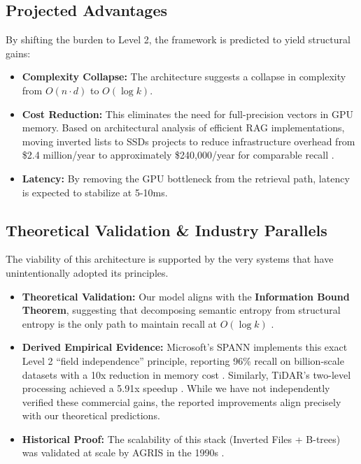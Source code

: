 \documentclass[manuscript,screen,nonacm]{acmart}
\begin{document}
\subsection{Projected Advantages}
By shifting the burden to Level 2, the framework is predicted to yield structural gains:
\begin{itemize}
    \item \textbf{Complexity Collapse:} The architecture suggests a collapse in complexity from $O(n \cdot d)$ to $O(\log k)$.
    \item \textbf{Cost Reduction:} This eliminates the need for full-precision vectors in GPU memory. Based on architectural analysis of efficient RAG implementations, moving inverted lists to SSDs projects to reduce infrastructure overhead from \$2.4 million/year to approximately \$240,000/year for comparable recall \cite{vectordb2024}.
    \item \textbf{Latency:} By removing the GPU bottleneck from the retrieval path, latency is expected to stabilize at 5-10ms.
\end{itemize}

\subsection{Theoretical Validation \& Industry Parallels}
The viability of this architecture is supported by the very systems that have unintentionally adopted its principles.
\begin{itemize}
    \item \textbf{Theoretical Validation:} Our model aligns with the \textbf{Information Bound Theorem}, suggesting that decomposing semantic entropy from structural entropy is the only path to maintain recall at $O(\log k)$ \cite{korten2025}.
    \item \textbf{Derived Empirical Evidence:} Microsoft's SPANN implements this exact Level 2 ``field independence'' principle, reporting 96\% recall on billion-scale datasets with a 10x reduction in memory cost \cite{chen2021}. Similarly, TiDAR's two-level processing achieved a 5.91x speedup \cite{liu2024}. While we have not independently verified these commercial gains, the reported improvements align precisely with our theoretical predictions.
    \item \textbf{Historical Proof:} The scalability of this stack (Inverted Files + B-trees) was validated at scale by AGRIS in the 1990s \cite{fao1995}.
\end{itemize}
\end{document}
